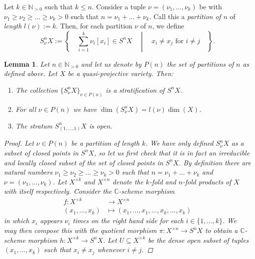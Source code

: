 \documentclass[12pt,a4paper]{amsart}
\theoremstyle{plain}
\newtheorem{lm}[thm]{Lemma}
\theoremstyle{definition}
\theoremstyle{remark}
\begin{document}
Let $k \in \mathbb{N}_{>0}$ such that $k \leq n$.
Consider a tuple $\nu = (\nu_{1}, \ldots, \nu_{k})$ be with $\nu_{1} \geq \nu_{2} \geq \ldots \geq \nu_{k} > 0$ such that $n = \nu_{1} + \ldots + \nu_{k}$.
Call this a \textit{partition of $n$} of \textit{length} $l(\nu) := k$.
Then, for each partition $\nu$ of $n$, we define
\[ S^{n}_{\nu}X := \left\{ \quad \sum_{i = 1}^{k} \nu_{i}[x_{i}] \in S^{n}X \quad \middle| \quad x_{i} \neq x_{j} \text{ for } i \neq j \quad \right\}. \]

\begin{lm}\label{lm:stratification}
  Let $n \in \mathbb{N}_{>0}$ and let us denote by $P(n)$ the set of partitions of $n$ as defined above.
  Let $X$ be a quasi-projective variety.
  Then:
  \begin{enumerate}[label=(\roman*)]
    \item The collection $\{ S_{\nu}^{n}X \}_{\nu \in P(n)}$ is a stratification of $S^{n}X$.
    \item For all $\nu \in P(n)$ we have $\dim(S_{\nu}^{n}X) = l(\nu)\dim(X)$.
    \item The stratum $S_{(1,\ldots,1)}^{n}X$ is open.
  \end{enumerate} 
  \begin{proof}
    Let $\nu \in P(n)$ be a partition of length $k$.
    We have only defined $S^{n}_{\nu}X$ as a subset of closed points in $S^{n}X$, so let us first check that it is in fact an irreducible and locally closed subset of the set of closed points in $S^{n}X$.
    By definition there are natural numbers $\nu_{1} \geq \nu_{2} \geq \ldots \geq \nu_{k} > 0$ such that $n = \nu_{1} + \ldots + \nu_{k}$ and $\nu = (\nu_{1},\ldots, \nu_{k})$.
    Let $X^{\times k}$ and $X^{\times n}$ denote the $k$-fold and $n$-fold products of $X$ with itself respectively.
    Consider the $\mathbb{C}$-scheme morphism
    \begin{align*}
      f \colon X^{\times k} & \longrightarrow X^{\times n} \\
      (x_{1}, \ldots, x_{k}) & \longmapsto (x_{1}, \ldots, x_{1}, \ldots, x_{k}, \ldots, x_{k})
    \end{align*}
    in which $x_{i}$ appears $\nu_{i}$ times on the right hand side for each $i \in \{1, \ldots, k \}$.
    We may then compose this with the quotient morphism $\pi \colon X^{\times n} \to S^{n}X$ to obtain a $\mathbb{C}$-scheme morphism $h \colon X^{\times k} \to S^{n}X$.
    Let $U \subseteq X^{\times k}$ be the dense open subset of tuples $(x_{1}, \ldots, x_{k})$ such that $x_{i} \neq x_{j}$ whenever $i \neq j$.

\end{proof}
\end{lm}
\end{document}
